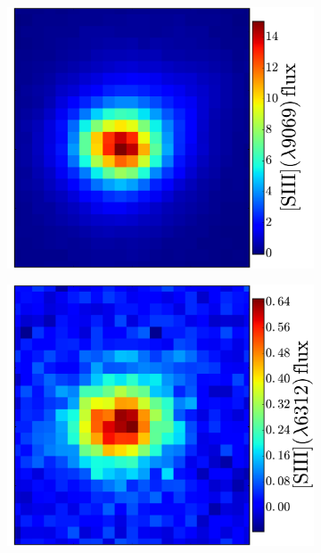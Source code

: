 \documentclass[traditabstract, referee]{aa}
\begin{document}
\begin{figure}
\begin{subfigure}{.24\textwidth}
\includegraphics[width=0.999\linewidth]{Figs/MUSE_SN1998bw_SIIIzoom.pdf}
\end{subfigure}
\begin{subfigure}{.24\textwidth}
\includegraphics[width=0.999\linewidth]{Figs/MUSE_SN1998bw_SIIIauzoom.pdf}
\end{subfigure}
\begin{subfigure}{.24\textwidth}

\end{subfigure}
\end{figure}
\end{document}
